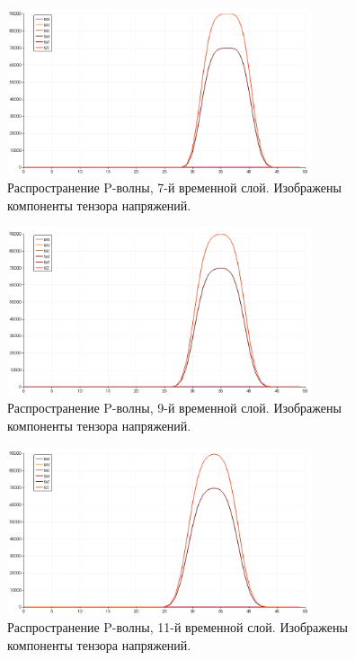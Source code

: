 \begin{figure}[htp]
\centering
\includegraphics[width=0.8\textwidth]{png/p-wave-test/s/0007.png}
\caption{Распространение P-волны, 7-й временной слой. Изображены компоненты тензора напряжений.}
\end{figure}

\begin{figure}[htp]
\centering
\includegraphics[width=0.8\textwidth]{png/p-wave-test/s/0009.png}
\caption{Распространение P-волны, 9-й временной слой. Изображены компоненты тензора напряжений.}
\end{figure}

\begin{figure}[htp]
\centering
\includegraphics[width=0.8\textwidth]{png/p-wave-test/s/0011.png}
\caption{Распространение P-волны, 11-й временной слой. Изображены компоненты тензора напряжений.}
\end{figure}


